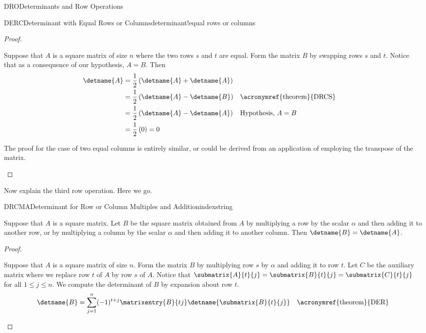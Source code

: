 \begin{subsect}{DRO}{Determinants and Row Operations}
\begin{theorem}{DERC}{Determinant with Equal Rows or Columns}{determinant!equal rows or columns}
\end{theorem}
%
\begin{proof}
\begin{para}Suppose that $A$ is a square matrix of size $n$ where the two rows $s$ and $t$ are equal.  Form the matrix $B$ by swapping rows $s$ and $t$.  Notice that as a consequence of our hypothesis, $A=B$.  Then
%
\begin{align*}
\detname{A}
&=
\frac{1}{2}\left(\detname{A}+\detname{A}\right)\\
%
&=
\frac{1}{2}\left(\detname{A}-\detname{B}\right)
&&\text{\acronymref{theorem}{DRCS}}\\
%
&=
\frac{1}{2}\left(\detname{A}-\detname{A}\right)
&&\text{Hypothesis, $A=B$}\\
%
&=
\frac{1}{2}\,(0)=0
%
\end{align*}
\end{para}
%
\begin{para}The proof for the case of two equal columns is entirely similar, or could be derived from an application of  employing the transpose of the matrix.\end{para}
%
\end{proof}
%
\begin{para}Now explain the third row operation.  Here we go.\end{para}
%
\begin{theorem}{DRCMA}{Determinant for Row or Column Multiples and Addition}{indexstring}
\begin{para}Suppose that $A$ is a square matrix.  Let $B$ be the square matrix obtained from $A$ by multiplying a row by the scalar $\alpha$ and then adding it to another row, or by multiplying a column by the scalar $\alpha$ and then adding it to another column.  Then $\detname{B}=\detname{A}$.\end{para}
\end{theorem}
%
\begin{proof}
\begin{para}Suppose that $A$ is a square matrix of size $n$.  Form the matrix $B$ by multiplying row $s$ by $\alpha$ and adding it to row $t$.  Let $C$ be the auxiliary matrix where we replace row $t$ of $A$ by row $s$ of $A$.  Notice that $\submatrix{A}{t}{j}=\submatrix{B}{t}{j}=\submatrix{C}{t}{j}$ for all $1\leq j\leq n$.  We compute the determinant of $B$ by expansion about row $t$.
%
\begin{align*}
\detname{B}
&=
\sum_{j=1}^{n}(-1)^{t+j}\matrixentry{B}{tj}\detname{\submatrix{B}{t}{j}}
&&\text{\acronymref{theorem}{DER}}\\

\end{align*}
\end{para}
\end{proof}
\end{subsect}
